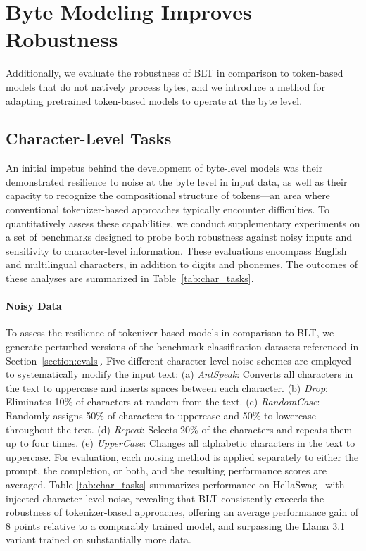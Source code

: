 \section{Byte Modeling Improves Robustness} Additionally, we evaluate the robustness of {\textsc BLT} in comparison to token-based models that do not natively process bytes, and we introduce a method for adapting pretrained token-based models to operate at the byte level.
\label{sec:robustness}

\subsection{Character-Level Tasks}

An initial impetus behind the development of byte-level models was their demonstrated resilience to noise at the byte level in input data, as well as their capacity to recognize the compositional structure of tokens—an area where conventional tokenizer-based approaches typically encounter difficulties. To quantitatively assess these capabilities, we conduct supplementary experiments on a set of benchmarks designed to probe both robustness against noisy inputs and sensitivity to character-level information. These evaluations encompass English and multilingual characters, in addition to digits and phonemes. The outcomes of these analyses are summarized in Table~\ref{tab:char_tasks}.

\paragraph{Noisy Data} To assess the resilience of tokenizer-based models in comparison to {\textsc BLT}, we generate perturbed versions of the benchmark classification datasets referenced in Section~\ref{section:evals}. Five different character-level noise schemes are employed to systematically modify the input text: (a) \textit{AntSpeak}: Converts all characters in the text to uppercase and inserts spaces between each character. (b) \textit{Drop}: Eliminates 10\% of characters at random from the text. (c) \textit{RandomCase}: Randomly assigns 50\% of characters to uppercase and 50\% to lowercase throughout the text. (d) \textit{Repeat}: Selects 20\% of the characters and repeats them up to four times. (e) \textit{UpperCase}: Changes all alphabetic characters in the text to uppercase. For evaluation, each noising method is applied separately to either the prompt, the completion, or both, and the resulting performance scores are averaged. Table \ref{tab:char_tasks} summarizes performance on HellaSwag~\citep{Eval_hellaswag} with injected character-level noise, revealing that {\textsc BLT} consistently exceeds the robustness of tokenizer-based approaches, offering an average performance gain of 8 points relative to a comparably trained model, and surpassing the Llama 3.1 variant trained on substantially more data.

